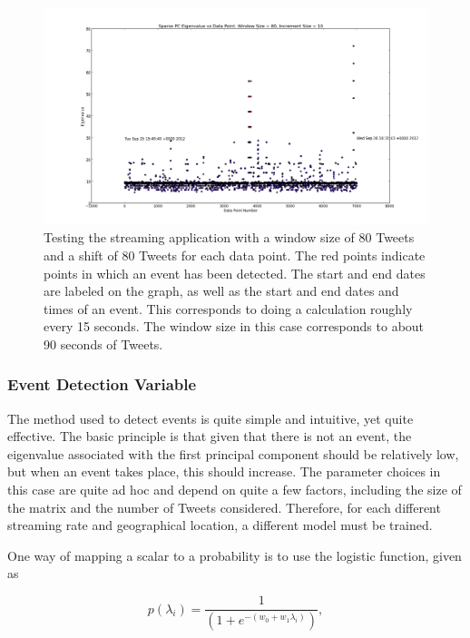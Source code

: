 \documentclass[11pt,a4paper]{article}
\begin{document}
\begin{figure}[H]
\centering
\includegraphics[scale=0.25]{Testing_Streaming_App_80_10.png}
\caption{Testing the streaming application with a window size of 80 Tweets and a shift of 80 Tweets for each data point. The red points indicate points in which an event has been detected. The start and end dates are labeled on the graph, as well as the start and end dates and times of an event. This corresponds to doing a calculation roughly every  15 seconds. The window size in this case corresponds to about 90 seconds of Tweets.}
\label{testing_app_80}
\end{figure}

\subsubsection{Event Detection Variable}
\label{event_detection}

The method used to detect events is quite simple and intuitive, yet quite effective. The basic principle is that given that there is not an event, the eigenvalue associated with the first principal component should be relatively low, but when an event takes place, this should increase. The parameter choices in this case are quite ad hoc and depend on quite a few factors, including the size of the matrix and the number of Tweets considered. Therefore, for each different streaming rate and geographical location, a different model must be trained. 

One way of mapping a scalar to a probability is to use the logistic function,\cite{bishop} given as

\begin{equation}
p(\lambda_i)= \frac{1}{\left( 1 + e^{-(w_0 + w_1\lambda_i)}\right)},
\label{logit}
\end{equation}
\end{document}
